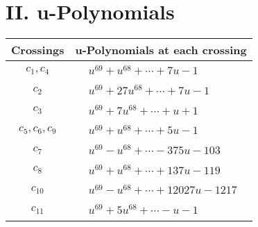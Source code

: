 \documentclass[1p]{elsarticle_modified}
\theoremstyle{definition}
\begin{document}
\newpage\renewcommand{\arraystretch}{1}
\centering \section*{ II. u-Polynomials}
\begin{tabular}{m{50pt}|m{274pt}}
Crossings & \hspace{64pt}u-Polynomials at each crossing \\
\hline $$\begin{aligned}c_{1},c_{4}\end{aligned}$$&$\begin{aligned}
&u^{69}+u^{68}+\cdots+7 u-1
\end{aligned}$\\
\hline $$\begin{aligned}c_{2}\end{aligned}$$&$\begin{aligned}
&u^{69}+27 u^{68}+\cdots+7 u-1
\end{aligned}$\\
\hline $$\begin{aligned}c_{3}\end{aligned}$$&$\begin{aligned}
&u^{69}+7 u^{68}+\cdots+u+1
\end{aligned}$\\
\hline $$\begin{aligned}c_{5},c_{6},c_{9}\end{aligned}$$&$\begin{aligned}
&u^{69}+u^{68}+\cdots+5 u-1
\end{aligned}$\\
\hline $$\begin{aligned}c_{7}\end{aligned}$$&$\begin{aligned}
&u^{69}- u^{68}+\cdots-375 u-103
\end{aligned}$\\
\hline $$\begin{aligned}c_{8}\end{aligned}$$&$\begin{aligned}
&u^{69}+u^{68}+\cdots+137 u-119
\end{aligned}$\\
\hline $$\begin{aligned}c_{10}\end{aligned}$$&$\begin{aligned}
&u^{69}- u^{68}+\cdots+12027 u-1217
\end{aligned}$\\
\hline $$\begin{aligned}c_{11}\end{aligned}$$&$\begin{aligned}
&u^{69}+5 u^{68}+\cdots- u-1
\end{aligned}$\\
\hline
\end{tabular}\newpage\renewcommand{\arraystretch}{1}
\end{document}
